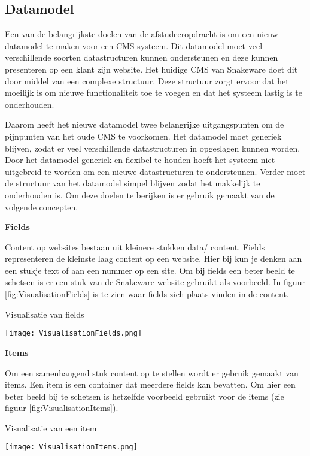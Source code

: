 \subsection{Datamodel}
Een van de belangrijkste doelen van de afstudeeropdracht is om een nieuw datamodel te maken voor een CMS-systeem.
Dit datamodel moet veel verschillende soorten datastructuren kunnen ondersteunen en deze kunnen presenteren op een klant zijn website.
Het huidige CMS van Snakeware doet dit door middel van een complexe structuur.
Deze structuur zorgt ervoor dat het moeilijk is om nieuwe functionaliteit toe te voegen en dat het systeem lastig is te onderhouden.

\whitespace
Daarom heeft het nieuwe datamodel twee belangrijke uitgangspunten om de pijnpunten van het oude CMS te voorkomen.
Het datamodel moet generiek blijven, zodat er veel verschillende datastructuren in opgeslagen kunnen worden.
Door het datamodel generiek en flexibel te houden hoeft het systeem niet uitgebreid te worden om een nieuwe datastructuren te ondersteunen.
Verder moet de structuur van het datamodel simpel blijven zodat het makkelijk te onderhouden is.
Om deze doelen te berijken is er gebruik gemaakt van de volgende concepten.

\whitespace
\textbf{Fields}

\whitespace
Content op websites bestaan uit kleinere stukken data/ content.
    Fields representeren de kleinste laag content op een website. 
    Hier bij kun je denken aan een stukje text of aan een nummer op een site.
    Om bij fields een beter beeld te schetsen is er een stuk van de Snakeware website gebruikt als voorbeeld.
    In figuur \ref{fig:VisualisationFields} is te zien  waar fields zich plaats vinden in de content.

\whitespace[2]
\begin{graphic}
    \captionsetup{type=figure}
    \caption{Visualisatie van fields}
    \texttt{[image: VisualisationFields.png]}
    \label{fig:VisualisationFields}
\end{graphic}

\whitespace
\textbf{Items}

\whitespace
Om een samenhangend stuk content op te stellen wordt er gebruik gemaakt van items.
Een item is een container dat meerdere fields kan bevatten.
Om hier een beter beeld bij te schetsen is hetzelfde voorbeeld gebruikt voor de items (zie figuur \ref{fig:VisualisationItems}).

\whitespace[2]
\begin{graphic}
    \captionsetup{type=figure}
    \caption{Visualisatie van een item}
    \texttt{[image: VisualisationItems.png]}
    \label{fig:VisualisationItems}
\end{graphic}

